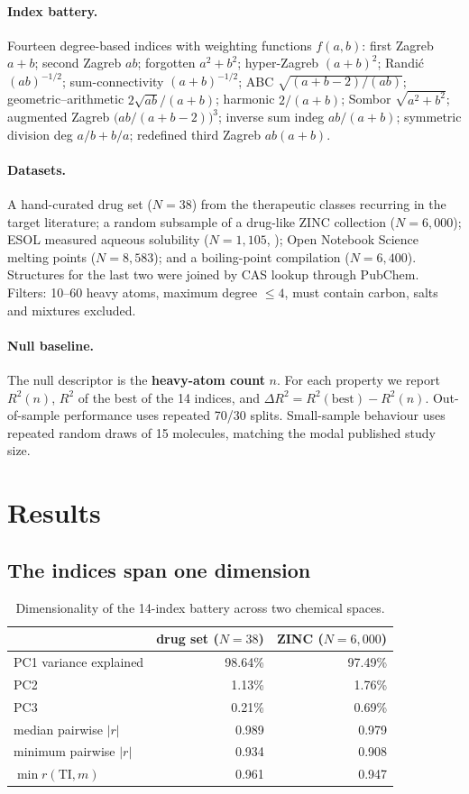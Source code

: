 \documentclass[11pt,a4paper]{article}
\theoremstyle{plain}
\newcommand{\TI}{\mathrm{TI}}
\begin{document}
\paragraph{Index battery.} Fourteen degree-based indices with weighting functions
$f(a,b)$: first Zagreb $a+b$; second Zagreb $ab$; forgotten $a^2+b^2$; hyper-Zagreb
$(a+b)^2$; Randi\'c $(ab)^{-1/2}$; sum-connectivity $(a+b)^{-1/2}$; ABC
$\sqrt{(a+b-2)/(ab)}$; geometric--arithmetic $2\sqrt{ab}/(a+b)$; harmonic $2/(a+b)$;
Sombor $\sqrt{a^2+b^2}$; augmented Zagreb $\bigl(ab/(a+b-2)\bigr)^3$; inverse sum indeg
$ab/(a+b)$; symmetric division deg $a/b+b/a$; redefined third Zagreb $ab(a+b)$.

\paragraph{Datasets.} A hand-curated drug set ($N=38$) from the therapeutic classes
recurring in the target literature; a random subsample of a drug-like ZINC collection
($N=6{,}000$); ESOL measured aqueous solubility ($N=1{,}105$, \citealp{delaney2004});
Open Notebook Science melting points ($N=8{,}583$); and a boiling-point compilation
($N=6{,}400$). Structures for the last two were joined by CAS lookup through PubChem.
Filters: 10--60 heavy atoms, maximum degree $\le 4$, must contain carbon, salts and
mixtures excluded.

\paragraph{Null baseline.} The null descriptor is the \textbf{heavy-atom count} $n$. For
each property we report $R^2(n)$, $R^2$ of the best of the 14 indices, and
$\Delta R^2=R^2(\text{best})-R^2(n)$. Out-of-sample performance uses repeated 70/30
splits. Small-sample behaviour uses repeated random draws of 15 molecules, matching the
modal published study size.

\section{Results}

\subsection{The indices span one dimension}

\begin{table}[h]\centering\small
\caption{Dimensionality of the 14-index battery across two chemical spaces.}
\begin{tabular}{lrr}
\toprule
& drug set ($N=38$) & ZINC ($N=6{,}000$)\\
\midrule
PC1 variance explained & 98.64\% & 97.49\%\\
PC2 & 1.13\% & 1.76\%\\
PC3 & 0.21\% & 0.69\%\\
median pairwise $|r|$ & 0.989 & 0.979\\
minimum pairwise $|r|$ & 0.934 & 0.908\\
$\min r(\TI,m)$ & 0.961 & 0.947\\
\bottomrule
\end{tabular}
\end{table}
\end{document}
